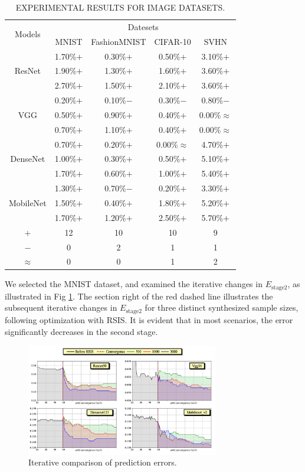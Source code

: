 \documentclass[lettersize,journal]{IEEEtran}
\begin{document}
\begin{table}[!t]
  \centering
  \caption{EXPERIMENTAL RESULTS FOR IMAGE DATASETS.}\label{tab5}
  \begin{tabular}{ccccc}
  \toprule
  \multirow{2}{*}{Models} & \multicolumn{4}{c}{Datesets}  \\ 
  \cmidrule{2-5}
   & MNIST & FashionMNIST & CIFAR-10 & SVHN \\
  \cmidrule{1-5}
  \multirow{3}{*}{ResNet} & 1.70\%$+$ & 0.30\%$+$ & 0.50\%$+$ & 3.10\%$+$ \\
   & 1.90\%$+$ & 1.30\%$+$ & 1.60\%$+$ & 3.60\%$+$ \\
   & 2.70\%$+$ & 1.50\%$+$ & 2.10\%$+$ & 3.60\%$+$ \\
  \cmidrule{2-5}
  \multirow{3}{*}{VGG} & 0.20\%$+$ & 0.10\%$-$ & 0.30\%$-$ & 0.80\%$-$ \\
   & 0.50\%$+$ & 0.90\%$+$ & 0.40\%$+$ & 0.00\%$\approx$ \\
   & 0.70\%$+$ & 1.10\%$+$ & 0.40\%$+$ & 0.00\%$\approx$ \\
  \cmidrule{2-5}
  \multirow{3}{*}{DenseNet} & 0.70\%$+$ & 0.20\%$+$ & 0.00\%$\approx$ & 4.70\%$+$ \\
   & 1.00\%$+$ & 0.30\%$+$ & 0.50\%$+$ & 5.10\%$+$ \\
   & 1.70\%$+$ & 0.60\%$+$ & 1.00\%$+$ & 5.40\%$+$ \\
  \cmidrule{2-5}
  \multirow{3}{*}{MobileNet} & 1.30\%$+$ & 0.70\%$-$ & 0.20\%$+$ & 3.30\%$+$ \\
   & 1.50\%$+$ & 0.40\%$+$ & 1.80\%$+$ & 5.20\%$+$ \\
   & 1.70\%$+$ & 1.20\%$+$ & 2.50\%$+$ & 5.70\%$+$ \\
  \cmidrule{1-5}
  $+$ & 12 & 10 & 10 & 9 \\
  $-$ & 0  & 2  & 1  & 1 \\
  $\approx$ & 0 & 0 & 1 &2 \\
  \bottomrule
  \end{tabular}
\end{table}

We selected the MNIST dataset, and examined the iterative changes 
in $E_{\text{stage2}}$, as illustrated in Fig \ref{Fig8}. The section 
right of the red dashed line illustrates the subsequent iterative 
changes in $E_{\text{stage2}}$ for three distinct synthesized 
sample sizes, following optimization with RSIS. It is evident 
that in most scenarios, the error significantly decreases in the 
second stage.

\begin{figure}[!b]
  \centering
  \includegraphics[width=3.3in]{Fig8.png}
  \caption{Iterative comparison of prediction errors.}
  \label{Fig8}
\end{figure}
\end{document}
